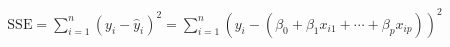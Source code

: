\documentclass[preview]{standalone}
\begin{document}
\begin{align*}
\text{SSE} = \sum_{i=1}^n (y_i - \hat{y}_i)^2 = \sum_{i=1}^n (y_i - (\beta_0 + \beta_1 x_{i1} + \cdots + \beta_p x_{ip}))^2
\end{align*}
\end{document}
